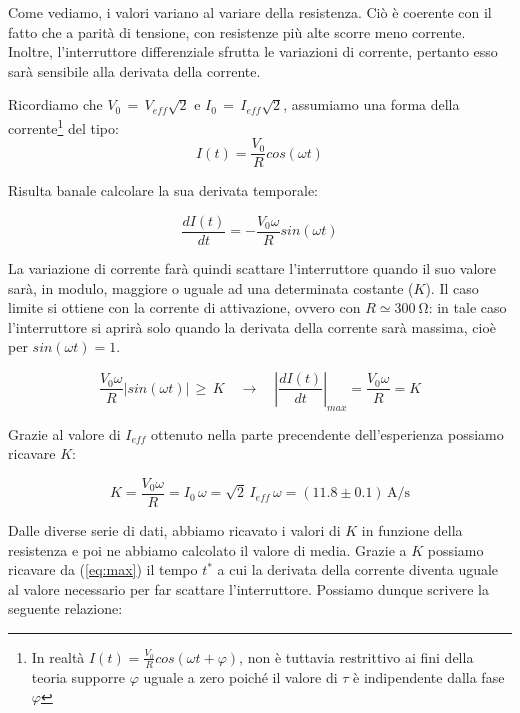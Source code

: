 Come vediamo, i valori variano al variare della resistenza. Ciò è coerente con il fatto che a parità di tensione, con resistenze più alte scorre meno corrente. Inoltre, l'interruttore differenziale sfrutta le variazioni di corrente, pertanto esso sarà sensibile alla derivata della corrente.

\noindent Ricordiamo che $V_0 \, = \, V_{eff} \sqrt{2}$ e $I_0 \, = \, I_{eff} \sqrt{2}$, assumiamo una forma della corrente\footnote{In realtà $I(t)=\frac{V_0}{R}cos(\omega t + \varphi)$, non è tuttavia restrittivo ai fini della teoria supporre $\varphi$ uguale a zero poiché il valore di $\tau$ è indipendente dalla fase $\varphi$} del tipo:
\begin{equation}
I(t)=\frac{V_0}{R}cos(\omega t)
\label{eq:corrente}
\end{equation}

Risulta banale calcolare la sua derivata temporale:

\begin{equation}
\frac{dI(t)}{dt}=-\frac{V_0 \omega}{R}sin(\omega t)
\label{eq:derivata}
\end{equation}

\noindent La variazione di corrente farà quindi scattare l'interruttore quando il suo valore sarà, in modulo, maggiore o uguale ad una determinata costante ($K$). Il caso limite si ottiene con la corrente di attivazione, ovvero con $R \simeq \SI{300}{\ohm}$: in tale caso l'interruttore si aprirà solo quando la derivata della corrente sarà massima, cioè per $sin(\omega t) = 1$.

\begin{equation}
\frac{V_0 \omega}{R}|sin(\omega t)| \, \geq \, K	\quad \longrightarrow  \quad	
\left\vert \frac{dI(t)}{dt} \right\vert_{max} = \frac{V_0 \omega}{R} = K
\label{eq:max}
\end{equation}

\noindent Grazie al valore di $I_{eff}$ ottenuto nella parte precendente dell'esperienza possiamo ricavare $K$:

\begin{equation}
K = \frac{V_0 \omega}{R} = I_0 \,\omega = \sqrt{2}\,I_{eff} \,\omega  = (11.8 \pm 0.1)\, \si{\ampere\per\second}
\label{eq:K}
\end{equation}

\noindent Dalle diverse serie di dati, abbiamo ricavato i valori di $K$ in funzione della resistenza e poi ne abbiamo calcolato il valore di media. Grazie a $K$ possiamo ricavare da (\ref{eq:max}) il tempo $t^*$ a cui la derivata della corrente diventa uguale al valore necessario per far scattare l'interruttore. Possiamo dunque scrivere la seguente relazione:

